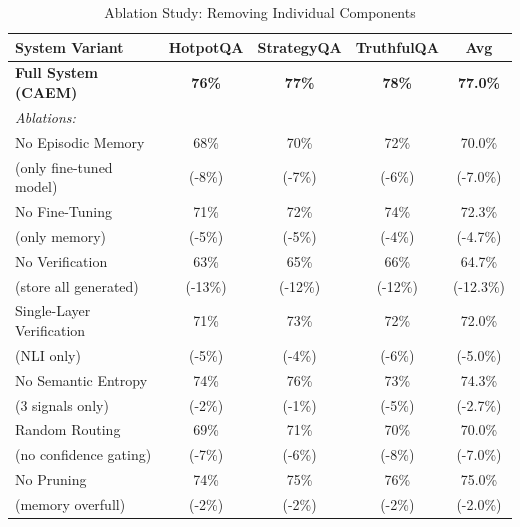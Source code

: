 \documentclass[12pt,a4paper]{article}
\theoremstyle{definition}
\begin{document}
\begin{table}[htbp]
\centering
\caption{Ablation Study: Removing Individual Components}
\small
\begin{tabular}{lcccc}
\toprule
\textbf{System Variant} & \textbf{HotpotQA} & \textbf{StrategyQA} & \textbf{TruthfulQA} & \textbf{Avg} \\
\midrule
\textbf{Full System (CAEM)} & \textbf{76\%} & \textbf{77\%} & \textbf{78\%} & \textbf{77.0\%} \\
\midrule
\textit{Ablations:} & & & & \\
No Episodic Memory & 68\% & 70\% & 72\% & 70.0\% \\
\quad (only fine-tuned model) & (-8\%) & (-7\%) & (-6\%) & (-7.0\%) \\
\midrule
No Fine-Tuning & 71\% & 72\% & 74\% & 72.3\% \\
\quad (only memory) & (-5\%) & (-5\%) & (-4\%) & (-4.7\%) \\
\midrule
No Verification & 63\% & 65\% & 66\% & 64.7\% \\
\quad (store all generated) & (-13\%) & (-12\%) & (-12\%) & (-12.3\%) \\
\midrule
Single-Layer Verification & 71\% & 73\% & 72\% & 72.0\% \\
\quad (NLI only) & (-5\%) & (-4\%) & (-6\%) & (-5.0\%) \\
\midrule
No Semantic Entropy & 74\% & 76\% & 73\% & 74.3\% \\
\quad (3 signals only) & (-2\%) & (-1\%) & (-5\%) & (-2.7\%) \\
\midrule
Random Routing & 69\% & 71\% & 70\% & 70.0\% \\
\quad (no confidence gating) & (-7\%) & (-6\%) & (-8\%) & (-7.0\%) \\
\midrule
No Pruning & 74\% & 75\% & 76\% & 75.0\% \\
\quad (memory overfull) & (-2\%) & (-2\%) & (-2\%) & (-2.0\%) \\
\bottomrule
\end{tabular}
\end{table}
\end{document}
